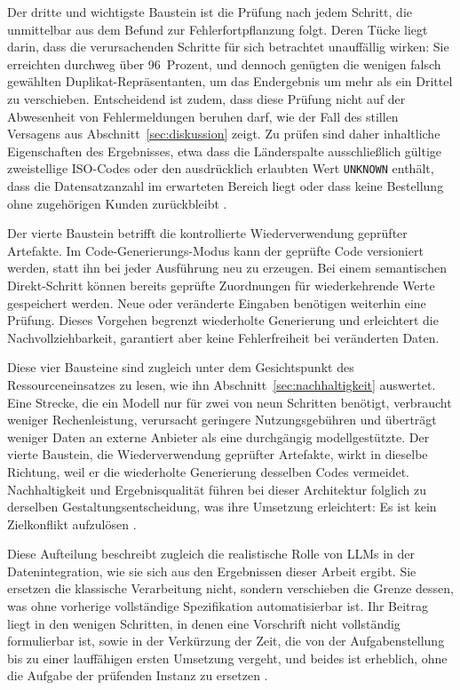 Der dritte und wichtigste Baustein ist die Prüfung nach jedem Schritt, die unmittelbar aus dem Befund zur Fehlerfortpflanzung folgt. Deren Tücke liegt darin, dass die verursachenden Schritte für sich betrachtet unauffällig wirken: Sie erreichten durchweg über 96~Prozent, und dennoch genügten die wenigen falsch gewählten Duplikat-Repräsentanten, um das Endergebnis um mehr als ein Drittel zu verschieben. Entscheidend ist zudem, dass diese Prüfung nicht auf der Abwesenheit von Fehlermeldungen beruhen darf, wie der Fall des stillen Versagens aus Abschnitt~\ref{sec:diskussion} zeigt. Zu prüfen sind daher inhaltliche Eigenschaften des Ergebnisses, etwa dass die Länderspalte ausschließlich gültige zweistellige ISO-Codes oder den ausdrücklich erlaubten Wert \texttt{UNKNOWN} enthält, dass die Datensatzanzahl im erwarteten Bereich liegt oder dass keine Bestellung ohne zugehörigen Kunden zurückbleibt \autocite{ridzuanReviewDataQuality2024,mumuniAutomatedDataProcessing2025}.

Der vierte Baustein betrifft die kontrollierte Wiederverwendung geprüfter Artefakte. Im Code-Generierungs-Modus kann der geprüfte Code versioniert werden, statt ihn bei jeder Ausführung neu zu erzeugen. Bei einem semantischen Direkt-Schritt können bereits geprüfte Zuordnungen für wiederkehrende Werte gespeichert werden. Neue oder veränderte Eingaben benötigen weiterhin eine Prüfung. Dieses Vorgehen begrenzt wiederholte Generierung und erleichtert die Nachvollziehbarkeit, garantiert aber keine Fehlerfreiheit bei veränderten Daten.

Diese vier Bausteine sind zugleich unter dem Gesichtspunkt des Ressourceneinsatzes zu lesen, wie ihn Abschnitt~\ref{sec:nachhaltigkeit} auswertet. Eine Strecke, die ein Modell nur für zwei von neun Schritten benötigt, verbraucht weniger Rechenleistung, verursacht geringere Nutzungsgebühren und überträgt weniger Daten an externe Anbieter als eine durchgängig modellgestützte. Der vierte Baustein, die Wiederverwendung geprüfter Artefakte, wirkt in dieselbe Richtung, weil er die wiederholte Generierung desselben Codes vermeidet. Nachhaltigkeit und Ergebnisqualität führen bei dieser Architektur folglich zu derselben Gestaltungsentscheidung, was ihre Umsetzung erleichtert: Es ist kein Zielkonflikt aufzulösen \autocite{2026AIIndex,changEfficientPromptingMethods2024}.

Diese Aufteilung beschreibt zugleich die realistische Rolle von \acp{LLM} in der Datenintegration, wie sie sich aus den Ergebnissen dieser Arbeit ergibt. Sie ersetzen die klassische Verarbeitung nicht, sondern verschieben die Grenze dessen, was ohne vorherige vollständige Spezifikation automatisierbar ist. Ihr Beitrag liegt in den wenigen Schritten, in denen eine Vorschrift nicht vollständig formulierbar ist, sowie in der Verkürzung der Zeit, die von der Aufgabenstellung bis zu einer lauffähigen ersten Umsetzung vergeht, und beides ist erheblich, ohne die Aufgabe der prüfenden Instanz zu ersetzen \autocite{walhaDataIntegrationTraditional2024,khanCognitiveETLUsing2025}.
